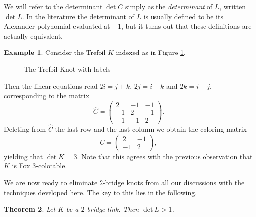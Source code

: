 \documentclass{article}
\newtheorem{theorem}{Theorem}[section]
\theoremstyle{definition}
\newtheorem{example}[theorem]{Example}
\begin{document}
We will refer to the determinant $\det C$ simply as the \textit{determinant} of $L$, written $\det L$. In the literature the determinant of $L$ is usually defined to be its Alexander polynomial evaluated at $-1$, but it turns out that these definitions are actually equivalent.

\begin{example}
Consider the Trefoil $K$ indexed as in Figure \ref{fig:trefoil-labeled-for-coloring}.
\begin{figure}[ht]
\centering
{}
\caption{The Trefoil Knot with labels}
\label{fig:trefoil-labeled-for-coloring}
\end{figure}

Then the linear equations read $2i = j + k$, $2j = i + k$ and $2k = i + j$, corresponding to the matrix
$$\widehat{C} = \left(\begin{matrix}
2 & -1 & -1 \\
-1 & 2 & -1 \\
-1 & -1 & 2
\end{matrix}\right).$$
Deleting from $\widehat{C}$ the last row and the last column we obtain the coloring matrix
$$C = \left( \begin{matrix}
2 & -1 \\
-1 & 2
\end{matrix} \right),$$
yielding that $\det K = 3$. Note that this agrees with the previous observation that $K$ is Fox $3$-colorable.
\end{example}

We are now ready to eliminate $2$-bridge knots from all our discussions with the techniques developed here. The key to this lies in the following.

\begin{theorem}
Let $K$ be a $2$-bridge link. Then $\det L > 1$.
\end{theorem}
\end{document}

